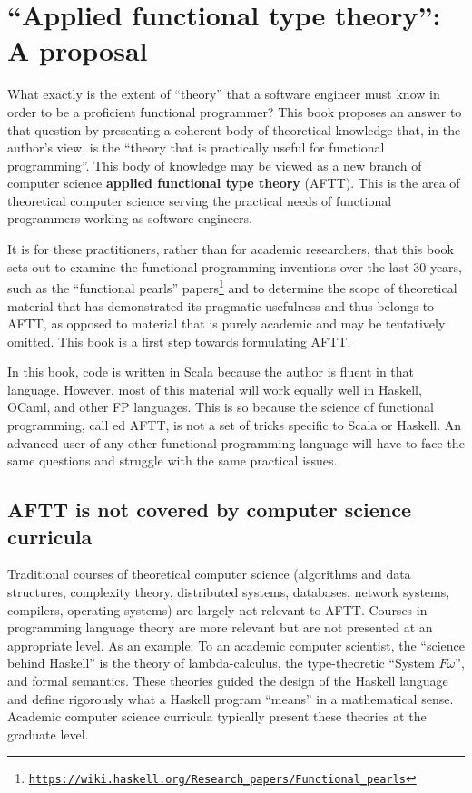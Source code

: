 
\chapter{``Applied functional type theory'': A proposal\label{chap:Applied-functional-type}}

What exactly is the extent of ``theory'' that a software engineer
must know in order to be a proficient functional programmer? This
book proposes an answer to that question by presenting a coherent
body of theoretical knowledge that, in the author's view, is the ``theory
that is practically useful for functional programming''. This body
of knowledge may be viewed as a new branch of computer science \textemdash{}\textbf{
applied functional type theory}
(AFTT). This is the area of theoretical computer science serving the
practical needs of functional programmers working as software engineers.

It is for these practitioners, rather than for academic researchers,
that this book sets out to examine the functional programming inventions
over the last 30 years, \textendash{} such as the \textquotedblleft functional
pearls\textquotedblright{} papers\footnote{\texttt{\href{https://wiki.haskell.org/Research_papers/Functional_pearls}{https://wiki.haskell.org/Research\_papers/Functional\_pearls}}}
\textendash{} and to determine the scope of theoretical material that
has demonstrated its pragmatic usefulness and thus belongs to AFTT,
as opposed to material that is purely academic and may be tentatively
omitted. This book is a first step towards formulating AFTT.

In this book, code is written in Scala because the author is fluent
in that language. However, most of this material will work equally
well in Haskell, OCaml, and other FP languages. This is so because
the science of functional programming, call ed AFTT, is not a set
of tricks specific to Scala or Haskell. An advanced user of any other
functional programming language will have to face the same questions
and struggle with the same practical issues.

\section{AFTT is not covered by computer science curricula}

Traditional courses of theoretical computer science (algorithms and
data structures, complexity theory, distributed systems, databases,
network systems, compilers, operating systems) are largely not relevant
to AFTT. Courses in programming language theory are more relevant
but are not presented at an appropriate level. As an example: To an
academic computer scientist, the ``science behind Haskell'' is the
theory of lambda-calculus, the type-theoretic ``System $F\omega$'',
and formal semantics. These theories guided the design of the Haskell
language and define rigorously what a Haskell program ``means''
in a mathematical sense. Academic computer science curricula typically
present these theories at the graduate level. 

